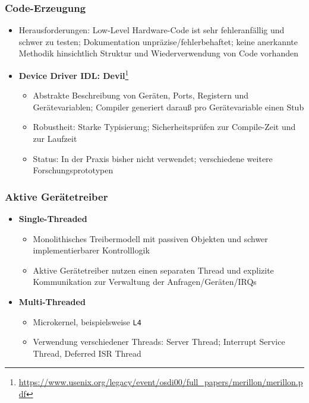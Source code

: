\subsubsection{Code-Erzeugung}
\begin{itemize}
	\item Herausforderungen: Low-Level Hardware-Code ist sehr fehleranfällig und schwer zu testen; Dokumentation unpräzise/fehlerbehaftet; keine anerkannte Methodik hinsichtlich Struktur und Wiederverwendung von Code vorhanden
	\item \textbf{Device Driver IDL: Devil}\footnote{\url{https://www.usenix.org/legacy/event/osdi00/full_papers/merillon/merillon.pdf}}
	\begin{itemize}
		\item Abstrakte Beschreibung von Geräten, Ports, Registern und Gerätevariablen; Compiler generiert darauß pro Gerätevariable einen Stub
		\item Robustheit: Starke Typisierung; Sicherheitsprüfen zur Compile-Zeit und zur Laufzeit
		\item Status: In der Praxis bisher nicht verwendet; verschiedene weitere Forschungsprototypen
	\end{itemize}
\end{itemize}

\subsubsection{Aktive Gerätetreiber}
\begin{itemize}
	\item \textbf{Single-Threaded}
	\begin{itemize}
		\item Monolithisches Treibermodell mit passiven Objekten und schwer implementierbarer Kontrolllogik
		\item Aktive Gerätetreiber nutzen einen separaten Thread und explizite Kommunikation zur Verwaltung der Anfragen/Geräten/IRQs
	\end{itemize}
	\item \textbf{Multi-Threaded}
	\begin{itemize}
		\item Microkernel, beispielsweise \texttt{L4}
		\item Verwendung verschiedener Threads: Server Thread; Interrupt Service Thread, Deferred ISR Thread
	\end{itemize}
\end{itemize}

